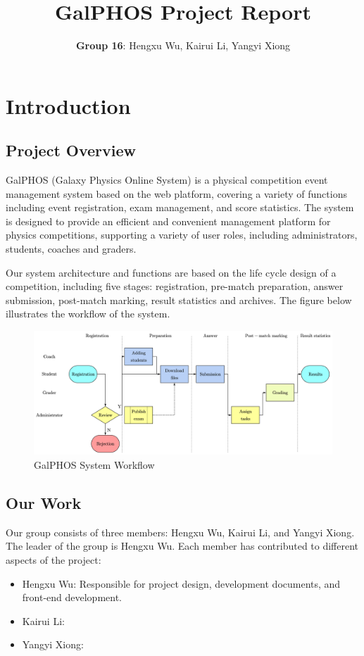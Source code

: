 \documentclass[12pt]{article}
\title{GalPHOS Project Report}
\author{\textbf{Group 16}: Hengxu Wu, Kairui Li, Yangyi Xiong}
\date{}
\begin{document}
\maketitle

\section{Introduction}
\subsection{Project Overview}

GalPHOS (Galaxy Physics Online System) is a physical competition event management system based on the web platform, covering a variety of functions including event registration, exam management, and score statistics. The system is designed to provide an efficient and convenient management platform for physics competitions, supporting a variety of user roles, including administrators, students, coaches and graders.

Our system architecture and functions are based on the life cycle design of a competition, including five stages: registration, pre-match preparation, answer submission, post-match marking, result statistics and archives. The figure below illustrates the workflow of the system.
\begin{figure}[H]
    \centering
    \includegraphics[width=\textwidth]{Fig1.png}
    \caption{GalPHOS System Workflow}
    \label{fig:workflow}
\end{figure}

\subsection{Our Work}

Our group consists of three members: Hengxu Wu, Kairui Li, and Yangyi Xiong. The leader of the group is Hengxu Wu. Each member has contributed to different aspects of the project:
\begin{itemize}
    \item Hengxu Wu: Responsible for project design, development documents, and front-end development.
    \item Kairui Li: %
    \item Yangyi Xiong: %
\end{itemize}
\end{document}
